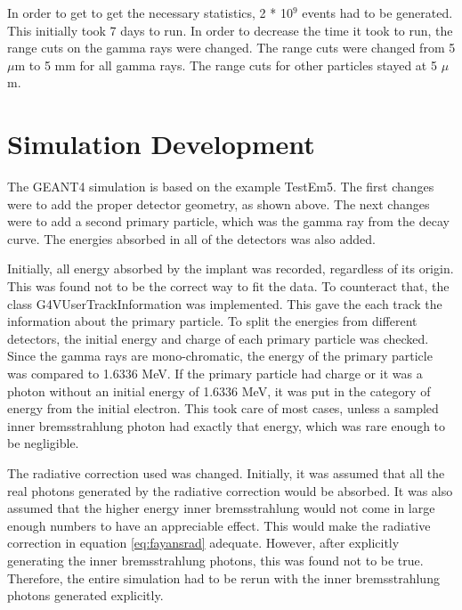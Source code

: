 In order to get to get the necessary statistics, 2 * 10$^{9}$ events had to be generated. 
This initially took 7 days to run. 
In order to decrease the time it took to run, the range cuts on the gamma rays were changed.
The range cuts were changed from 5 $\mu$m to 5 mm for all gamma rays.
The range cuts for other particles stayed at 5 $\mu$m.

\section{Simulation Development}
The GEANT4 simulation is based on the example TestEm5.
The first changes were to add the proper detector geometry, as shown above.
The next changes were to add a second primary particle, which was the gamma ray from the decay curve.
The energies absorbed in all of the detectors was also added.

Initially, all energy absorbed by the implant was recorded, regardless of its origin.
This was found not to be the correct way to fit the data.
To counteract that, the class G4VUserTrackInformation was implemented.
This gave the each track the information about the primary particle.
To split the energies from different detectors, the initial energy and charge of each primary particle was checked.
Since the gamma rays are mono-chromatic, the energy of the primary particle was compared to 1.6336 MeV.
If the primary particle had charge or it was a photon without an initial energy of 1.6336 MeV, it was put in the category of energy from the initial electron. 
This took care of most cases, unless a sampled inner bremsstrahlung photon had exactly that energy, which was rare enough to be negligible.

The radiative correction used was changed.
Initially, it was assumed that all the real photons generated by the radiative correction would be absorbed.
It was also assumed that the higher energy inner bremsstrahlung would not come in large enough numbers to have an appreciable effect. 
This would make the radiative correction in equation \ref{eq:fayansrad} adequate. 
However, after explicitly generating the inner bremsstrahlung photons, this was found not to be true.
Therefore, the entire simulation had to be rerun with the inner bremsstrahlung photons generated explicitly.
  
